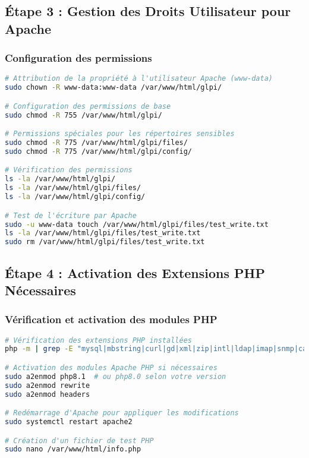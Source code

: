\documentclass[12pt,a4paper]{article}
\begin{document}
\subsection{Étape 3 : Gestion des Droits Utilisateur pour Apache}

\subsubsection{Configuration des permissions}
\begin{lstlisting}[language=bash, caption=Attribution des droits Apache]
# Attribution de la propriété à l'utilisateur Apache (www-data)
sudo chown -R www-data:www-data /var/www/html/glpi/

# Configuration des permissions de base
sudo chmod -R 755 /var/www/html/glpi/

# Permissions spéciales pour les répertoires sensibles
sudo chmod -R 775 /var/www/html/glpi/files/
sudo chmod -R 775 /var/www/html/glpi/config/

# Vérification des permissions
ls -la /var/www/html/glpi/
ls -la /var/www/html/glpi/files/
ls -la /var/www/html/glpi/config/

# Test de l'écriture par Apache
sudo -u www-data touch /var/www/html/glpi/files/test_write.txt
ls -la /var/www/html/glpi/files/test_write.txt
sudo rm /var/www/html/glpi/files/test_write.txt
\end{lstlisting}

\subsection{Étape 4 : Activation des Extensions PHP Nécessaires}

\subsubsection{Vérification et activation des modules PHP}
\begin{lstlisting}[language=bash, caption=Configuration des extensions PHP]
# Vérification des extensions PHP installées
php -m | grep -E "mysql|mbstring|curl|gd|xml|zip|intl|ldap|imap|snmp|cas|apcu"

# Activation des modules Apache PHP si nécessaires
sudo a2enmod php8.1  # ou php8.0 selon votre version
sudo a2enmod rewrite
sudo a2enmod headers

# Redémarrage d'Apache pour appliquer les modifications
sudo systemctl restart apache2

# Création d'un fichier de test PHP
sudo nano /var/www/html/info.php
\end{lstlisting}
\end{document}
